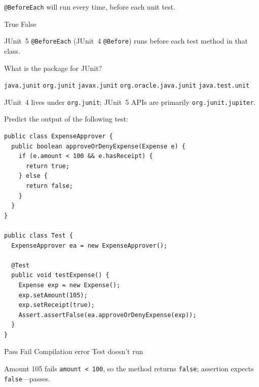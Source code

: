 \question[4]
\texttt{@BeforeEach} will run every time, before each unit test.
\begin{choices}
  \CorrectChoice True
  \choice False
\end{choices}
\begin{solution}
  JUnit~5 \texttt{@BeforeEach} (JUnit~4 \texttt{@Before}) runs before each test method in that class.
\end{solution}

\question[4]
What is the package for JUnit?
\begin{choices}
  \choice \texttt{java.junit}
  \CorrectChoice \texttt{org.junit}
  \choice \texttt{javax.junit}
  \choice \texttt{org.oracle.java.junit}
  \choice \texttt{java.test.unit}
\end{choices}
\begin{solution}
  JUnit~4 lives under \texttt{org.junit}; JUnit~5 APIs are primarily \texttt{org.junit.jupiter}.
\end{solution}

\newpage

\question[4]
Predict the output of the following test:
\begin{lstlisting}[style=java]
public class ExpenseApprover {
  public boolean approveOrDenyExpense(Expense e) {
    if (e.amount < 100 && e.hasReceipt) {
      return true;
    } else {
      return false;
    }
  }
}

public class Test {
  ExpenseApprover ea = new ExpenseApprover();

  @Test
  public void testExpense() {
    Expense exp = new Expense();
    exp.setAmount(105);
    exp.setReceipt(true);
    Assert.assertFalse(ea.approveOrDenyExpense(exp));
  }
}
\end{lstlisting}
\begin{choices}
  \CorrectChoice Pass
  \choice Fail
  \choice Compilation error
  \choice Test doesn't run
\end{choices}
\begin{solution}
  Amount 105 fails \texttt{amount < 100}, so the method returns \texttt{false}; assertion expects \texttt{false}---passes.
\end{solution}

